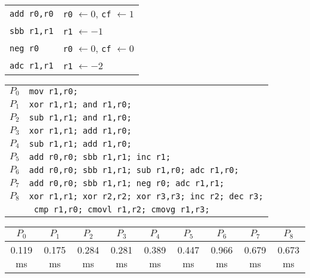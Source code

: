 \documentclass{beamer}
\renewcommand{\gets}{\leftarrow}
\begin{document}
\begin{frame}[containsverbatim]
\begin{table}
\begin{tabular}{l|l}
\verb|add r0,r0|
& \verb|r0| $\gets 0$, \verb|cf| $\gets 1$ \\
\verb|sbb r1,r1|
& \verb|r1| $\gets -1$ \\
\verb|neg r0|
& \verb|r0| $\gets 0$, \verb|cf| $\gets 0$ \\
\verb|adc r1,r1|
& \verb|r1| $\gets -2$ \\
\end{tabular}
\end{table}
\end{frame}

\begin{frame}[containsverbatim]
\begin{table}
\begin{tabular}{l|l}
$P_0$ & \verb|mov r1,r0;| \\
$P_1$ & \verb|xor r1,r1; and r1,r0;| \\
$P_2$ & \verb|sub r1,r1; and r1,r0;| \\
$P_3$ & \verb|xor r1,r1; add r1,r0;| \\
$P_4$ & \verb|sub r1,r1; add r1,r0;| \\
$P_5$ & \verb|add r0,r0; sbb r1,r1; inc r1;| \\
$P_6$ & \verb|add r0,r0; sbb r1,r1; sub r1,r0; adc r1,r0;| \\
$P_7$ & \verb|add r0,r0; sbb r1,r1; neg r0; adc r1,r1;| \\
$P_8$ & \verb|xor r1,r1; xor r2,r2; xor r3,r3; inc r2; dec r3;|\\
      & \verb| cmp r1,r0; cmovl r1,r2; cmovg r1,r3;| \\
\end{tabular}
\end{table}
\end{frame}

\begin{frame}
\begin{table}
\begin{tabular}{*{9}{c}}
$P_0$    & $P_1$    & $P_2$    & $P_3$    & $P_4$    & $P_5$    & $P_6$    & $P_7$    & $P_8$    \\
\hline
0.119 ms & 0.175 ms & 0.284 ms & 0.281 ms & 0.389 ms & 0.447 ms & 0.966 ms & 0.679 ms & 0.673 ms \\
\end{tabular}
\end{table}
\end{frame}
\end{document}
